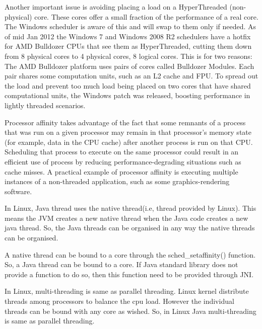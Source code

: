 \documentclass[final_report.tex]{subfiles}
\begin{document}
Another important issue is avoiding placing a load on a HyperThreaded (non-physical) core. These cores offer a small fraction of the performance of a real core. The Windows scheduler is aware of this and will swap to them only if needed. As of mid Jan 2012 the Windows 7 and Windows 2008 R2 schedulers have a hotfix for AMD Bulldozer CPUs that see them as HyperThreaded, cutting them down from 8 physical cores to 4 physical cores, 8 logical cores. This is for two reasons: The AMD Bulldozer platform uses pairs of cores called Bulldozer Modules. Each pair shares some computation units, such as an L2 cache and FPU. To spread out the load and prevent too much load being placed on two cores that have shared computational units, the Windows patch was released, boosting performance in lightly threaded scenarios.

Processor affinity takes advantage of the fact that some remnants of a process that was run on a given processor may remain in that processor's memory state (for example, data in the CPU cache) after another process is run on that CPU. Scheduling that process to execute on the same processor could result in an efficient use of process by reducing performance-degrading situations such as cache misses. A practical example of processor affinity is executing multiple instances of a non-threaded application, such as some graphics-rendering software.

In Linux, Java thread uses the native thread(i.e, thread provided by Linux).
This means the JVM creates a new native thread when the Java code creates a new java thread. So, the Java threads can be organised in any way the native threads can be organised.

A native thread can be bound to a core through the sched\_setaffinity() function. So, a Java thread can be bound to a core. If Java standard library does not provide a function to do so, then this function need to be provided through JNI.

In Linux, multi-threading is same as parallel threading. Linux kernel distribute threads among processors to balance the cpu load. However the individual threads can be bound with any core as wished. So, in Linux Java multi-threading is same as parallel threading.
\end{document}
